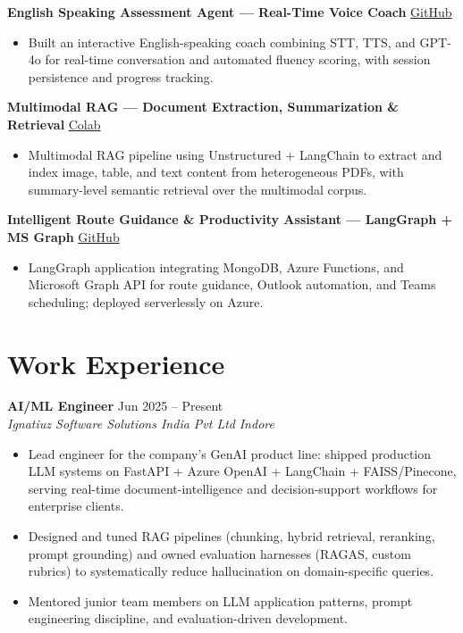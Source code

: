 \documentclass[11pt,a4paper]{article}
\newcommand{\resumeSubheading}[4]{
  \textbf{#1} \hfill #2 \\
  \textit{#3} \hfill \textit{#4}
}
\newcommand{\projectHeading}[2]{
  \textbf{#1} \hfill #2
}
\begin{document}
\projectHeading{English Speaking Assessment Agent --- Real-Time Voice Coach}{\href{https://github.com/gauravgarwal9011/English-Speaking-Assessment-Agent}{GitHub}}
\begin{itemize}
    \item Built an interactive English-speaking coach combining STT, TTS, and GPT-4o for real-time conversation and automated fluency scoring, with session persistence and progress tracking.
\end{itemize}

\projectHeading{Multimodal RAG --- Document Extraction, Summarization \& Retrieval}{\href{https://colab.research.google.com/drive/17X2a4DnVv8hmJB_-H1OjRcyG8gMubiAb?usp=sharing}{Colab}}
\begin{itemize}
    \item Multimodal RAG pipeline using Unstructured + LangChain to extract and index image, table, and text content from heterogeneous PDFs, with summary-level semantic retrieval over the multimodal corpus.
\end{itemize}

\projectHeading{Intelligent Route Guidance \& Productivity Assistant --- LangGraph + MS Graph}{\href{https://github.com/gauravgarwal9011/Intelligent-Route-Guidance-and-Productivity-Assistant}{GitHub}}
\begin{itemize}
    \item LangGraph application integrating MongoDB, Azure Functions, and Microsoft Graph API for route guidance, Outlook automation, and Teams scheduling; deployed serverlessly on Azure.
\end{itemize}

\section*{Work Experience}
\resumeSubheading{AI/ML Engineer}{Jun 2025 -- Present}{Ignatiuz Software Solutions India Pvt Ltd}{Indore}
\begin{itemize}
    \item Lead engineer for the company's GenAI product line: shipped production LLM systems on FastAPI + Azure OpenAI + LangChain + FAISS/Pinecone, serving real-time document-intelligence and decision-support workflows for enterprise clients.
    \item Designed and tuned RAG pipelines (chunking, hybrid retrieval, reranking, prompt grounding) and owned evaluation harnesses (RAGAS, custom rubrics) to systematically reduce hallucination on domain-specific queries.
    \item Mentored junior team members on LLM application patterns, prompt engineering discipline, and evaluation-driven development.
\end{itemize}
\end{document}
